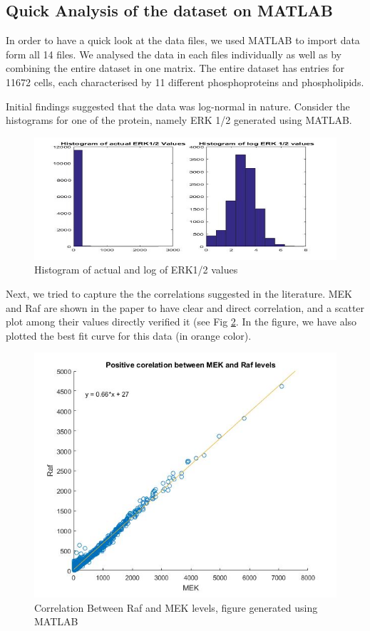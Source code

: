\documentclass[conference]{IEEEtran}
\begin{document}
\subsection*{Quick Analysis of the dataset on MATLAB \cite{guide1998mathworks}}
In order to have a quick look at the data files, we used MATLAB to import data form all 14 files. We analysed the data in each files individually as well as by combining the entire dataset in one matrix. The entire dataset has entries for 11672 cells, each characterised by 11 different phosphoproteins and phospholipids. 
\par 
Initial findings suggested that the data was log-normal in nature. Consider the histograms for one of the protein, namely ERK 1/2 generated using MATLAB.
\begin{figure}[H]
  \includegraphics[width=\linewidth]{Images/log-normal.jpg}
  \caption{Histogram of actual and log of ERK1/2 values}
  \label{fig:lognormal}
\end{figure}
Next, we tried to capture the the correlations suggested in the literature. MEK and Raf are shown in the paper to have clear and direct correlation, and a scatter plot among their values directly verified it (see Fig \ref{fig:rafmek}. In the figure, we have also plotted the best fit curve for this data (in orange color).
\begin{figure}[H]
  \includegraphics[width=\linewidth]{Images/rafmek.jpg}
  \caption{Correlation Between Raf and MEK levels, figure generated using MATLAB}
  \label{fig:rafmek}
\end{figure}
\end{document}
